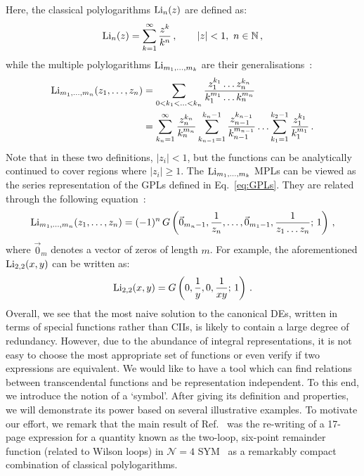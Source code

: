 \documentclass[main.tex]{subfiles}
\begin{document}
Here, the classical polylogarithms $\text{Li}_n(z)$ are defined as:
\begin{equation} \label{eq:Lidefinition}
    \text{Li}_n(z) = \sum_{k=1}^\infty \frac{z^k}{k^n}\,, \qquad |z|<1,\,\, n \in \mathbb{N}\,,
\end{equation}
while the multiple polylogarithms $\text{Li}_{m_1, \ldots, m_k}$ are their generalisations~\cite{2011arXiv1105.2076G, Duhr:2019tlz}:
\begin{subequations}
\begin{align} \label{eq:multiLidefinition}
    \text{Li}_{m_1, \ldots, m_n}(z_1, \ldots, z_n) &= \sum_{0<k_1<\ldots<k_n} \frac{z_1^{k_1} \ldots z_n^{k_n}}{k_1^{m_1} \ldots k_n^{m_n}} \\
    &= \sum_{k_n=1}^\infty \frac{z_n^{k_n}}{k_n^{m_n}} \sum_{k_{n-1}=1}^{k_n-1} \frac{z_{n-1}^{k_{n-1}}}{k_{n-1}^{m_{n-1}}}\ldots \sum_{k_1=1}^{k_2-1} \frac{z_1^{k_1}}{k_1^{m_1}}\,. \label{eq:multiLidefinition2}
\end{align}
\end{subequations}
Note that in these two definitions, $|z_i|<1$, but the functions can be analytically continued to cover regions where $|z_i| \ge 1$. The $\text{Li}_{m_1, \ldots, m_k}$ MPLs can be viewed as the series representation of the GPLs defined in Eq.~\ref{eq:GPLs}. They are related through the following equation~\cite{Duhr:2011zq}:
\begin{equation} \label{eq:LiToG}
    \text{Li}_{m_1, \ldots, m_n}(z_1, \ldots, z_n) = (-1)^n\,G\left(\vec{0}_{m_n-1}, \frac{1}{z_n}, \ldots, \vec{0}_{m_1-1}, \frac{1}{z_1\ldots z_n}; \,1 \right)\,,
\end{equation}
where $\vec{0}_m$ denotes a vector of zeros of length $m$. For example, the aforementioned $\text{Li}_{2,2}(x, y)$ can be written as:%
\begin{equation}
     \text{Li}_{2,2}(x, y) = G\left(0, \frac{1}{y}, 0, \frac{1}{xy};\,1 \right)\,.
\end{equation}
Overall, we see that the most naive solution to the canonical DEs, written in terms of special functions rather than CIIs, is likely to contain a large degree of redundancy. However, due to the abundance of integral representations, it is not easy to choose the most appropriate set of functions or even verify if two expressions are equivalent. We would like to have a tool which can find relations between transcendental functions and be representation independent. To this end, we introduce the notion of a `symbol'\cite{Goncharov:2010jf, Duhr:2011zq}. After giving its definition and properties, we will demonstrate its power based on several illustrative examples. To motivate our effort, we remark that the main result of Ref.~\cite{Goncharov:2010jf} was the re-writing of a 17-page expression for a quantity known as the two-loop, six-point remainder function (related to Wilson loops) in $\mathcal{N}=4$ SYM~\cite{DelDuca:2009au, DelDuca:2010zg} as a remarkably compact combination of classical polylogarithms.
\end{document}
